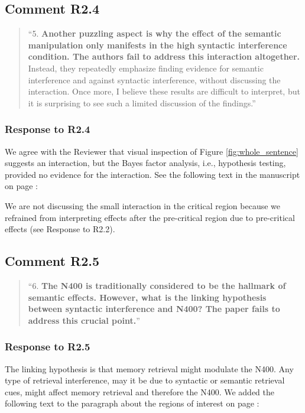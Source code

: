 \documentclass[12pt]{article}
\begin{document}
\newpage


\subsection*{Comment R2.4}
\begin{quote}
``5. \textbf{Another puzzling aspect is why the effect of the semantic manipulation only manifests in the high syntactic interference condition. The authors fail to address this interaction altogether.} Instead, they repeatedly emphasize finding evidence for semantic interference and against syntactic interference, without discussing the interaction. Once more, I believe these results are difficult to interpret, but it is surprising to see such a limited discussion of the findings.''
\end{quote}

\subsubsection*{Response to R2.4}
We agree with the Reviewer that visual inspection of Figure \ref{fig:whole_sentence} suggests an interaction, but the Bayes factor analysis, i.e., hypothesis testing, provided no evidence for the interaction. See the following text in the manuscript on page \pageref{insig_interaction}:


We are not discussing the small interaction in the critical region because we refrained from interpreting effects after the pre-critical region due to pre-critical effects (see Response to R2.2).

\subsection*{Comment R2.5}
\begin{quote}
``6. \textbf{The N400 is traditionally considered to be the hallmark of semantic effects. However, what is the linking hypothesis between syntactic interference and N400? The paper fails to address this crucial point.}''
\end{quote}

\subsubsection*{Response to R2.5}
The linking hypothesis is that memory retrieval might modulate the N400. Any type of retrieval interference, may it be due to syntactic or semantic retrieval cues, might affect memory retrieval and therefore the N400. We added the following text to the paragraph about the regions of interest on page \pageref{why_n400}:
\end{document}
